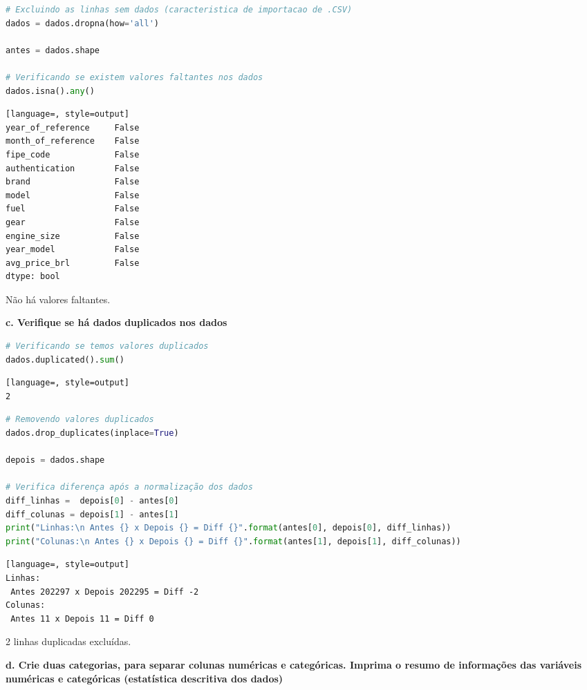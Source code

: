 \begin{lstlisting}[language=Python, style=input]
# Excluindo as linhas sem dados (caracteristica de importacao de .CSV)
dados = dados.dropna(how='all')

antes = dados.shape

# Verificando se existem valores faltantes nos dados 
dados.isna().any()
\end{lstlisting}
\begin{lstlisting}[language=, style=output]
year_of_reference     False
month_of_reference    False
fipe_code             False
authentication        False
brand                 False
model                 False
fuel                  False
gear                  False
engine_size           False
year_model            False
avg_price_brl         False
dtype: bool
\end{lstlisting}
Não há valores faltantes.


\begin{adjustwidth}{1em}{}
\textbf{c. Verifique se há dados duplicados nos dados}
\end{adjustwidth}


\begin{lstlisting}[language=Python, style=input]
# Verificando se temos valores duplicados
dados.duplicated().sum() 
\end{lstlisting}
\begin{lstlisting}[language=, style=output]
2
\end{lstlisting}

\begin{lstlisting}[language=Python, style=input]
# Removendo valores duplicados
dados.drop_duplicates(inplace=True)

depois = dados.shape

# Verifica diferença após a normalização dos dados
diff_linhas =  depois[0] - antes[0]
diff_colunas = depois[1] - antes[1]
print("Linhas:\n Antes {} x Depois {} = Diff {}".format(antes[0], depois[0], diff_linhas))
print("Colunas:\n Antes {} x Depois {} = Diff {}".format(antes[1], depois[1], diff_colunas))
\end{lstlisting}
\begin{lstlisting}[language=, style=output]
Linhas:
 Antes 202297 x Depois 202295 = Diff -2
Colunas:
 Antes 11 x Depois 11 = Diff 0
\end{lstlisting}

2 linhas duplicadas excluídas.

\begin{adjustwidth}{1em}{}
\textbf{d. Crie duas categorias, para separar colunas numéricas e categóricas. Imprima o resumo de informações das variáveis numéricas e categóricas (estatística descritiva dos dados)}
\end{adjustwidth}

